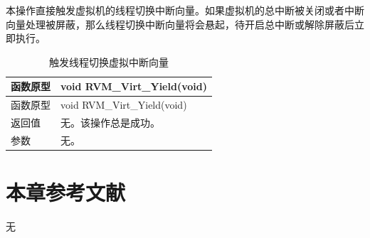 本操作直接触发虚拟机的线程切换中断向量。如果虚拟机的总中断被关闭或者中断向量处理被屏蔽，那么线程切换中断向量将会悬起，待开启总中断或解除屏蔽后立即执行。

\begin{xltabular}{\textwidth}{@{}>{\hsize\raggedright\arraybackslash}X>{\hsize\raggedright\arraybackslash}X@{}}
\caption{触发线程切换虚拟中断向量}\label{tab:4-26}\\
\toprule
函数原型 & void RVM\_\allowbreak{}Virt\_\allowbreak{}Yield(void)\tabularnewline
\endfirsthead
\toprule
函数原型 & void RVM\_\allowbreak{}Virt\_\allowbreak{}Yield(void)\tabularnewline
\midrule
\endhead
\bottomrule
\endlastfoot
返回值 & 无。该操作总是成功。\tabularnewline
参数 & 无。\tabularnewline
\end{xltabular}

\section{本章参考文献}\label{sec:4-6}

无

